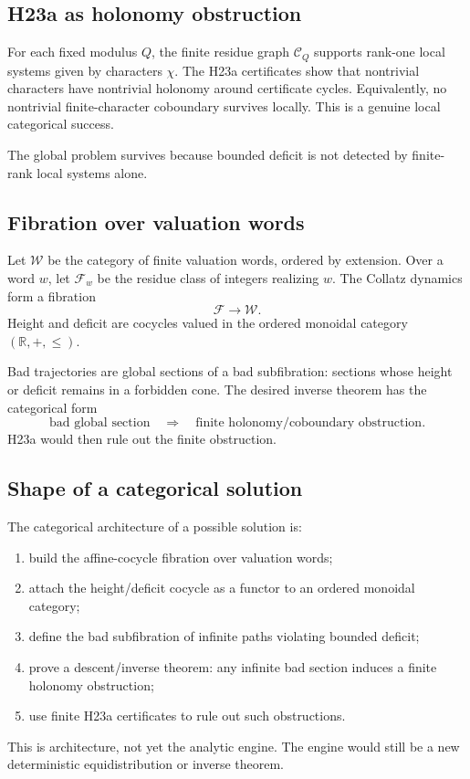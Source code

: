 \documentclass[11pt]{article}
\begin{document}
\subsection{H23a as holonomy obstruction}
For each fixed modulus $Q$, the finite residue graph $\mathcal C_Q$ supports rank-one local systems given by characters $\chi$.  The H23a certificates show that nontrivial characters have nontrivial holonomy around certificate cycles.  Equivalently, no nontrivial finite-character coboundary survives locally.  This is a genuine local categorical success.

The global problem survives because bounded deficit is not detected by finite-rank local systems alone.

\subsection{Fibration over valuation words}
Let $\mathcal W$ be the category of finite valuation words, ordered by extension.  Over a word $w$, let $\mathcal F_w$ be the residue class of integers realizing $w$.  The Collatz dynamics form a fibration
\[
\mathcal F\to\mathcal W.
\]
Height and deficit are cocycles valued in the ordered monoidal category $(\mathbb R,+,\le)$.

Bad trajectories are global sections of a bad subfibration: sections whose height or deficit remains in a forbidden cone.  The desired inverse theorem has the categorical form
\[
\text{bad global section}\quad\Longrightarrow\quad\text{finite holonomy/coboundary obstruction}.
\]
H23a would then rule out the finite obstruction.

\subsection{Shape of a categorical solution}
The categorical architecture of a possible solution is:
\begin{enumerate}[leftmargin=2em]
\item build the affine-cocycle fibration over valuation words;
\item attach the height/deficit cocycle as a functor to an ordered monoidal category;
\item define the bad subfibration of infinite paths violating bounded deficit;
\item prove a descent/inverse theorem: any infinite bad section induces a finite holonomy obstruction;
\item use finite H23a certificates to rule out such obstructions.
\end{enumerate}
This is architecture, not yet the analytic engine.  The engine would still be a new deterministic equidistribution or inverse theorem.
\end{document}
